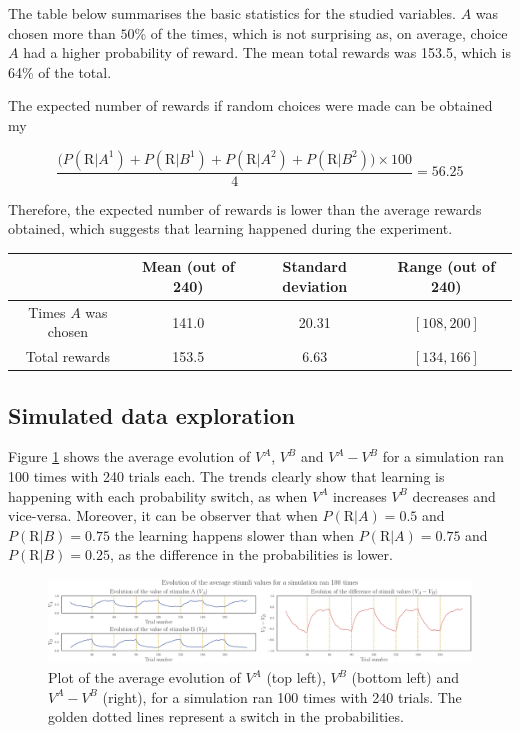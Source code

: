 \documentclass[12pt]{article}
\begin{document}
The table below summarises the basic statistics for the studied variables. $A$ was chosen more than $50\%$ of the times, which is not surprising as, on average, choice $A$ had a higher probability of reward. The mean total rewards was 153.5, which is 64\% of the total.

The expected number of rewards if random choices were made can be obtained my

\[ \frac{\big(P(\mathrm{R} | A^1) + P(\mathrm{R} | B^1) + P(\mathrm{R} | A^2) + P(\mathrm{R} | B^2)\big) \times 100}{4} = 56.25 \]

Therefore, the expected number of rewards is lower than the average rewards obtained, which suggests that learning happened during the experiment.

\begin{center}
 \begin{tabular}{|c || c | c | c|} 
 \hline
  & Mean (out of 240) & Standard deviation & Range (out of 240) \\ [0.5ex] 
 \hline\hline
 Times $A$ was chosen & 141.0 & 20.31 & $[108, 200]$ \\ 
 \hline
 Total rewards & 153.5 & 6.63 & $[134,166]$ \\ [1ex] 
 \hline
\end{tabular}
\end{center}

\subsection{Simulated data exploration}

Figure \ref{fig:2.2} shows the average evolution of $V^A$, $V^B$ and $V^A - V^B$ for a simulation ran 100 times with 240 trials each. The trends clearly show that learning is happening with each probability switch, as when $V^A$ increases $V^B$ decreases and vice-versa. Moreover, it can be observer that when $P(\mathrm{R} | A) = 0.5 $ and $P(\mathrm{R} | B) = 0.75$ the learning happens slower than when $P(\mathrm{R} | A) = 0.75 $ and $P(\mathrm{R} | B) = 0.25$, as the difference in the probabilities is lower.

\begin{figure}[h!]
	\centering
	\hspace*{-0.4in}
	\includegraphics[width=1\linewidth]{figures/2.2.pdf}
	\caption{Plot of the average evolution of $V^A$ (top left), $V^B$ (bottom left) and $V^A - V^B$ (right), for a simulation ran 100 times with 240 trials. The golden dotted lines represent a switch in the probabilities.}
	\label{fig:2.2}
\end{figure}
\end{document}
